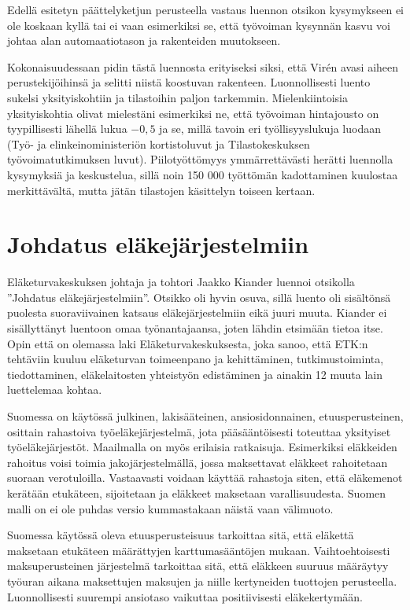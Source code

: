 \documentclass[12pt]{article}
\begin{document}
Edellä esitetyn päättelyketjun perusteella vastaus luennon otsikon kysymykseen ei ole koskaan kyllä tai ei vaan esimerkiksi se, että työvoiman kysynnän kasvu voi johtaa alan automaatiotason ja rakenteiden muutokseen.

Kokonaisuudessaan pidin tästä luennosta erityiseksi siksi, että Virén avasi aiheen perustekijöihinsä ja selitti niistä koostuvan rakenteen. Luonnollisesti luento sukelsi yksityiskohtiin ja tilastoihin paljon tarkemmin. Mielenkiintoisia yksityiskohtia olivat mielestäni esimerkiksi ne, että työvoiman hintajousto on tyypillisesti lähellä lukua $-0,5$ ja se, millä tavoin eri työllisyyslukuja luodaan (Työ- ja elinkeinoministeriön kortistoluvut ja Tilastokeskuksen työ\-voi\-ma\-tut\-ki\-muk\-sen luvut). Piilotyöttömyys ymmärrettävästi herätti luennolla kysymyksiä ja keskustelua, sillä noin 150 000 työttömän kadottaminen kuulostaa merkittävältä, mutta jätän tilastojen käsittelyn toiseen kertaan.


\newpage
\section{Johdatus eläkejärjestelmiin}

Eläketurvakeskuksen johtaja ja tohtori Jaakko Kiander luennoi otsikolla ''Johdatus eläkejärjestelmiin''. Otsikko oli hyvin osuva, sillä luento oli sisältönsä puolesta suoraviivainen katsaus eläkejärjestelmiin eikä juuri muuta. Kiander ei sisällyttänyt luentoon omaa työnantajaansa, joten lähdin etsimään tietoa itse. Opin että on olemassa laki Eläketurvakeskuksesta, joka sanoo, että ETK:n tehtäviin kuuluu eläketurvan toimeenpano ja kehittäminen, tutkimustoiminta, tiedottaminen, eläkelaitosten yhteistyön edistäminen ja ainakin 12 muuta lain luettelemaa kohtaa.

Suomessa on käytössä julkinen, lakisääteinen, ansiosidonnainen, etuusperusteinen, osittain rahastoiva työeläkejärjestelmä, jota pääsääntöisesti toteuttaa yksityiset työeläkejärjestöt. Maailmalla on myös erilaisia ratkaisuja. Esimerkiksi eläkkeiden rahoitus voisi toimia jakojärjestelmällä, jossa maksettavat eläkkeet rahoitetaan suoraan verotuloilla. Vastaavasti voidaan käyttää rahastoja siten, että eläkemenot kerätään etukäteen, sijoitetaan ja eläkkeet maksetaan varallisuudesta. Suomen malli on ei ole puhdas versio kummastakaan näistä vaan välimuoto.

Suomessa käytössä oleva etuusperusteisuus tarkoittaa sitä, että eläkettä maksetaan etukäteen määrättyjen karttumasääntöjen mukaan. Vaihtoehtoisesti maksuperusteinen järjestelmä tarkoittaa sitä, että eläkkeen suuruus määräytyy työuran aikana maksettujen maksujen ja niille kertyneiden tuottojen perusteella. Luonnollisesti suurempi ansiotaso vaikuttaa positiivisesti eläkekertymään.
\end{document}
